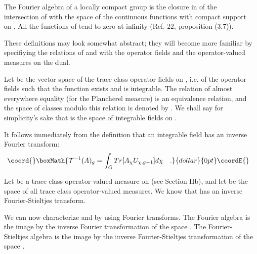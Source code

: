 \documentclass[a4paper,11pt]{article}
\def\Uc#1{U_{\chi,{#1}}}
\begin{document}
The Fourier algebra \coordHE{} of a locally compact group \coordHE{} is the closure in \coordHE{} of the 
intersection of \coordHE{} with the space \coordHE{} of the continuous functions with compact support 
on \coordHE{}. All the functions of \coordHE{} tend to zero at infinity (Ref. 22, proposition (3.7)). 

These definitions may look somewhat abstract; they will become more familiar by specifiying the 
relations of \coordHE{} and \coordHE{} with the operator fields and the operator-valued measures on the 
dual.

Let \coordHE{} be the vector space of the trace class operator fields on \coordHE{}, 
 i.e. 
of the operator fields  \coordHE{}  such that the function             
\coordHE{} exists and 
is integrable. The relation of almost everywhere equality (for the Plancherel measure) is an 
equivalence relation, and the space of classes modulo this relation is denoted by \coordHE{}. We 
shall say for simplicity's sake that \coordHE{} is the space of integrable fields on \coordHE{}. 

It follows immediately from the definition that an integrable field has an inverse Fourier 
transform:
$$\coord{}\boxMath{
\mathcal{T}^{-1}(A)_g = \int_G Tr[A_{\chi} \Uc{g-1}] d\chi   \quad .
}{dollar}{0pt}\coordE{}$$

Let \coordHE{} be a trace class operator-valued measure on \myHighlight{$\Gc$}\coordHE{} (see Section 
IIb), and let 
\coordHE{} be the space of all trace class operator-valued measures. We know that \coordHE{} 
has an inverse Fourier-Stieltjes transform. 

We can now characterize \coordHE{} and \coordHE{} by using Fourier transforms. The Fourier algebra 
\coordHE{} 
is the image by the inverse Fourier transformation of the space \coordHE{}. The Fourier-Stieltjes 
algebra \coordHE{} is the image by the inverse Fourier-Stieltjes transformation of the space 
\coordHE{}. 
\end{document}
